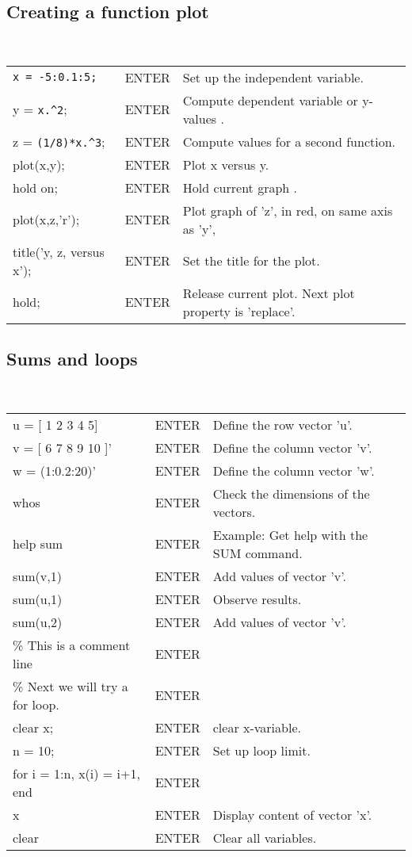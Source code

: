 \subsection{Creating a function plot} ~ \\
\begin{tabular}{lll}
  \ttt{>>} \verb!x = -5:0.1:5;!  &ENTER  &Set up the independent variable. \\
  \ttt{>>} y = \verb!x.^2!; &ENTER  & Compute dependent variable or
  y-values . \\ 
  \ttt{>>} z = \verb!(1/8)*x.^3!;      &ENTER  & Compute values for
  a second function. \\ 
  \ttt{>>} plot(x,y);     &ENTER  & Plot x versus y. \\
  \ttt{>>} hold on;      &ENTER &Hold current graph . \\
  \ttt{>>} plot(x,z,'r'); &ENTER &Plot graph of 'z', in red, on same
  axis as 'y', \\
  \ttt{>>} title('y, z, versus x'); & ENTER & Set the title for the
  plot. \\
  \ttt{>>} hold;         &ENTER &Release current plot.  Next plot
  property is 'replace'. \\ 
\end{tabular}

\subsection{Sums and loops} ~ \\
\begin{tabular}{lll}
  \ttt{>>} u = [ 1 2 3 4 5]  &ENTER &Define the row vector 'u'. \\
  \ttt{>>} v = [ 6 7 8 9 10 ]' &ENTER &Define the column vector 'v'.\\
  \ttt{>>} w = (1:0.2:20)' &ENTER & Define the column vector 'w'. \\
  \ttt{>>} whos     &ENTER &Check the dimensions of the vectors. \\
  \ttt{>>} help sum &ENTER &  Example:  Get help with the
  SUM command. \\ 
  \ttt{>>} sum(v,1) &ENTER &Add values of  vector 'v'.\\
  \ttt{>>} sum(u,1) &ENTER &Observe results. \\ 
  \ttt{>>} sum(u,2) &ENTER & Add values of vector 'v'. \\
  \ttt{>>} \%  This is a comment line  &ENTER & \\  
  \ttt{>>} \%  Next we will try a for loop. &ENTER & \\
  \ttt{>>} clear x; &ENTER &  clear x-variable.  \\      
  \ttt{>>} n = 10;  &ENTER &Set up loop limit. \\
  \ttt{>>} for i = 1:n, x(i) = i+1, end  &ENTER  & \\
  \ttt{>>} x   &ENTER &Display content of vector 'x'. \\
  \ttt{>>} clear &ENTER & Clear all variables. \\
\end{tabular}

